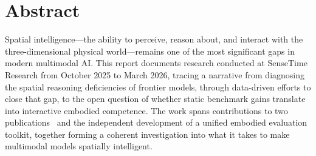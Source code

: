 \chapter*{Abstract}

Spatial intelligence---the ability to perceive, reason about, and interact with the three-dimensional physical world---remains one of the most significant gaps in modern multimodal AI. This report documents research conducted at SenseTime Research from October 2025 to March 2026, tracing a narrative from diagnosing the spatial reasoning deficiencies of frontier models, through data-driven efforts to close that gap, to the open question of whether static benchmark gains translate into interactive embodied competence. The work spans contributions to two publications~\cite{cai2025holisticevaluationmultimodalllms, cai2025scalingspatialintelligencemultimodal} and the independent development of a unified embodied evaluation toolkit, together forming a coherent investigation into what it takes to make multimodal models spatially intelligent.
